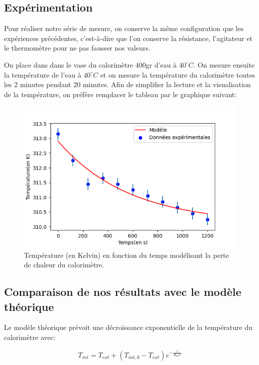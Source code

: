 \documentclass[12pt]{article}
\begin{document}
\subsection{Expérimentation}

Pour réaliser notre série de mesure, on conserve la même configuration que les expériences précédentes, c'est-à-dire
que l'on conserve la résistance, l'agitateur et le thermomètre pour ne pas fausser nos valeurs. 

On place dans dans le vase du calorimètre 400gr d'eau à $40^\circ C$. On mesure ensuite la température de l'eau à $40^\circ C$ et on mesure la température du calorimètre toutes les 2 minutes pendant 20 minutes.
Afin de simplifier la lecture et la visualisation de la température, on préfère remplacer le tableau par le graphique suivant:

\begin{figure}[h!]
	\begin{center}
		\includegraphics[scale=0.64]{img/Figure_2.png}
	\end{center}
	\label{fig:graph2}
	\caption{Température (en Kelvin) en fonction du temps modélisant la perte de chaleur du calorimètre.}
\end{figure}

\newpage
\subsection{Comparaison de nos résultats avec le modèle théorique}
Le modèle théorique prévoit une décroissance exponentielle de la température du calorimètre avec:

\begin{equation}
	T_{int} = T_{ext} + (T_{int, 0} - T_{ext}) e^{- \frac{t}{R_{th}C}}
\end{equation}
\end{document}
